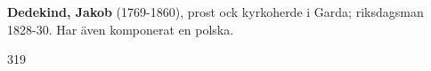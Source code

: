 \textbf{Dedekind, Jakob} (1769-1860), prost ock kyrkoherde i Garda; riksdagsman 1828-30\@. Har även komponerat en polska.

319 
